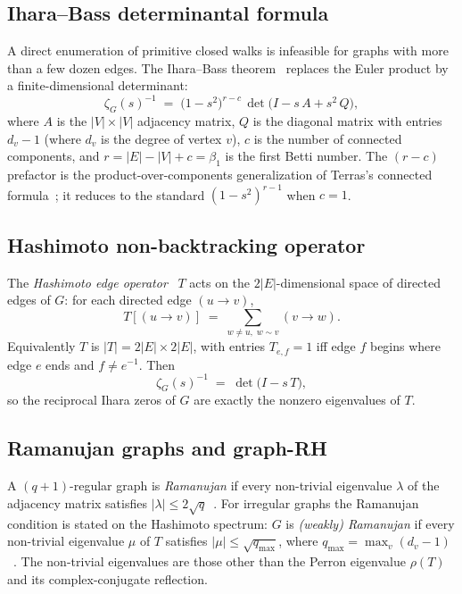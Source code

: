 \documentclass[11pt]{article}
\begin{document}
\subsection{Ihara--Bass determinantal formula}

A direct enumeration of primitive closed walks is infeasible for graphs
with more than a few dozen edges.  The Ihara--Bass
theorem~\cite{bass1992} replaces the Euler product by a finite-dimensional
determinant:
\begin{equation}
\zeta_G(s)^{-1} \;=\; \bigl(1 - s^2\bigr)^{r - c}\,
    \det\!\bigl(I - s\,A + s^2\,Q\bigr),
\label{eq:ihara_bass}
\end{equation}
where $A$ is the $|V|\times|V|$ adjacency matrix, $Q$ is the diagonal
matrix with entries $d_v - 1$ (where $d_v$ is the degree of vertex $v$),
$c$ is the number of connected components, and
$r = |E| - |V| + c = \beta_1$ is the first Betti number.  The
$(r-c)$ prefactor is the product-over-components generalization of
Terras's connected formula~\cite[Thm.~2.3]{terras2010}; it reduces to
the standard $(1-s^2)^{r-1}$ when $c=1$.

\subsection{Hashimoto non-backtracking operator}
\label{sec:hashimoto}

The \emph{Hashimoto edge operator}~\cite{hashimoto1989} $T$ acts on
the $2|E|$-dimensional space of directed edges of $G$: for each
directed edge $(u\to v)$,
\begin{equation}
T[(u\to v)] \;=\; \sum_{w\neq u,\; w\sim v} (v\to w).
\end{equation}
Equivalently $T$ is $|T|=2|E|\times 2|E|$, with entries
$T_{e,f}=1$ iff edge $f$ begins where edge $e$ ends and $f\neq e^{-1}$.
Then
\begin{equation}
\zeta_G(s)^{-1} \;=\; \det\!\bigl(I - s\,T\bigr),
\label{eq:ihara_hashimoto}
\end{equation}
so the reciprocal Ihara zeros of $G$ are exactly the nonzero
eigenvalues of $T$.

\subsection{Ramanujan graphs and graph-RH}

A $(q{+}1)$-regular graph is \emph{Ramanujan} if every non-trivial
eigenvalue $\lambda$ of the adjacency matrix satisfies
$|\lambda|\le 2\sqrt{q}$~\cite{lps1988,morgenstern1994}.  For irregular
graphs the Ramanujan condition is stated on the Hashimoto
spectrum: $G$ is \emph{(weakly) Ramanujan} if every non-trivial
eigenvalue $\mu$ of $T$ satisfies $|\mu|\le\sqrt{q_{\max}}$, where
$q_{\max} = \max_v(d_v - 1)$~\cite{kotani2000,terras2010}.
The non-trivial eigenvalues are those other than the Perron eigenvalue
$\rho(T)$ and its complex-conjugate reflection.
\end{document}
